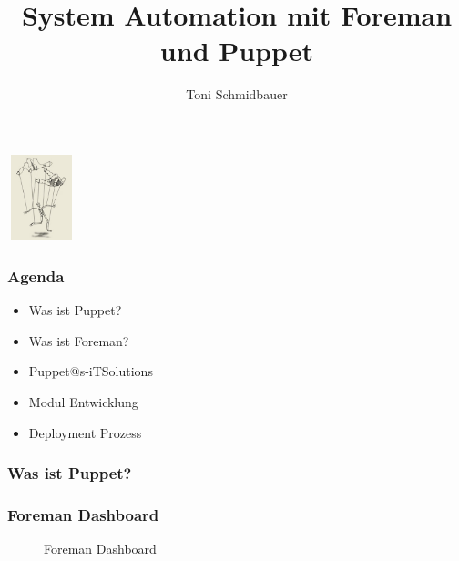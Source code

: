 \documentclass{beamer}
\title{System Automation mit Foreman und Puppet\\}
\author{Toni Schmidbauer}
\begin{document}
\begin{frame}
\center\includegraphics[height=2.5cm,width=2cm]{../pics/puppet.png}
\titlepage

\end{frame}

\begin{frame}

  \frametitle{Agenda}

  \begin{itemize}
  \item Was ist Puppet?
  \item Was ist Foreman?
  \item Puppet@s-iTSolutions
  \item Modul Entwicklung
  \item Deployment Prozess
  \end{itemize}

\end{frame}

\begin{frame}
  \frametitle{Was ist Puppet?}


\end{frame}

\begin{frame}
  \frametitle{Foreman Dashboard}
  \begin{figure}[ht]
    \centering
    \caption{Foreman Dashboard}
    \label{fig:stack}
  \end{figure}
\end{frame}
\end{document}
